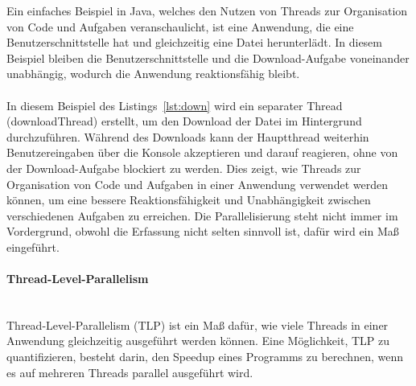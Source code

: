 Ein einfaches Beispiel in Java, welches den Nutzen von Threads zur Organisation von Code und Aufgaben veranschaulicht, ist eine Anwendung, die eine Benutzerschnittstelle hat und gleichzeitig eine Datei herunterlädt. In diesem Beispiel bleiben die Benutzerschnittstelle und die Download-Aufgabe voneinander unabhängig, wodurch die Anwendung reaktionsfähig bleibt.\\\\
In diesem Beispiel des Listings~\ref{lst:down} wird ein separater Thread (downloadThread) erstellt, um den Download der Datei im Hintergrund durchzuführen. Während des Downloads kann der Hauptthread weiterhin Benutzereingaben über die Konsole akzeptieren und darauf reagieren, ohne von der Download-Aufgabe blockiert zu werden. Dies zeigt, wie Threads zur Organisation von Code und Aufgaben in einer Anwendung verwendet werden können, um eine bessere Reaktionsfähigkeit und Unabhängigkeit zwischen verschiedenen Aufgaben zu erreichen. Die Parallelisierung steht nicht immer im Vordergrund, obwohl die Erfassung nicht selten sinnvoll ist, dafür wird ein Maß eingeführt.

\paragraph{Thread-Level-Parallelism\\\\}
Thread-Level-Parallelism (TLP) ist ein Maß dafür, wie viele Threads in einer Anwendung gleichzeitig ausgeführt werden können. Eine Möglichkeit, TLP zu quantifizieren, besteht darin, den Speedup eines Programms zu berechnen, wenn es auf mehreren Threads parallel ausgeführt wird.\\\\

